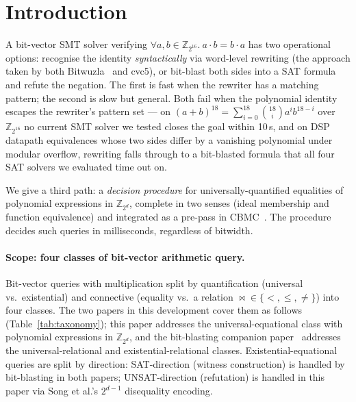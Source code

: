 \documentclass[runningheads]{llncs}
\newcommand{\cbmc}{\textsc{CBMC}\xspace}
\begin{document}
\section{Introduction}

A bit-vector SMT solver verifying
$\forall a, b \in \mathbb{Z}_{2^{16}}.\ a \cdot b = b \cdot a$ has
two operational options: recognise the identity \emph{syntactically}
via word-level rewriting (the approach taken by both
Bitwuzla~\cite{niemetz2023bitwuzla} and cvc5), or bit-blast both
sides into a SAT formula and refute the negation. The first is
fast when the rewriter has a matching pattern; the second is slow
but general. Both fail when the polynomial identity escapes the
rewriter's pattern set --- on
$(a + b)^{18} = \sum_{i=0}^{18} \binom{18}{i} a^i b^{18-i}$ over
$\mathbb{Z}_{2^{16}}$ no current SMT solver we tested closes the
goal within 10\,s, and on DSP datapath equivalences whose two
sides differ by a vanishing polynomial under modular overflow,
rewriting falls through to a bit-blasted formula that all four
SAT solvers we evaluated time out on.

We give a third path: a \emph{decision procedure} for
universally-quantified equalities of polynomial expressions in
$\mathbb{Z}_{2^d}$, complete in two senses (ideal membership and
function equivalence) and integrated as a pre-pass in
\cbmc~\cite{clarke2004tool}. The procedure decides such queries
in milliseconds, regardless of bitwidth.

\paragraph{Scope: four classes of bit-vector arithmetic query.}
Bit-vector queries with multiplication split by quantification
(universal vs.\ existential) and connective (equality vs.\ a
relation $\bowtie \in \{<, \leq, \neq\}$) into four classes. The
two papers in this development cover them as follows
(Table~\ref{tab:taxonomy}); this paper addresses the
universal-equational class with polynomial expressions in
$\mathbb{Z}_{2^d}$, and the bit-blasting companion
paper~\cite{companion-bitblasting} addresses the
universal-relational and existential-relational classes.
Existential-equational queries are split by direction:
SAT-direction (witness construction) is handled by bit-blasting
in both papers; UNSAT-direction (refutation) is handled in this
paper via Song et al.'s $2^{d-1}$ disequality encoding.
\end{document}
